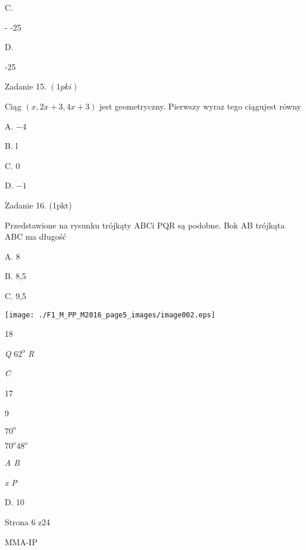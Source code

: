 \documentclass[a4paper,12pt]{article}
\begin{document}
C.

- -25

D.

-25

Zadanie 15. $(1pki)$

Ciąg $(x,2x+3,4x+3)$ jest geometryczny. Pierwszy wyraz tego ciągujest równy

A. $-4$

B. l

C. 0

D. $-1$

Zadanie 16. (1pkt)

Przedstawione na rysunku trójkąty ABCi PQR są podobne. Bok AB trójkąta ABC ma długość

A. 8

B. 8,5

C. 9,5
\begin{center}
\texttt{[image: ./F1\_M\_PP\_M2016\_page5\_images/image002.eps]}
\end{center}
18

{\it Q}  $62^{\mathrm{o}}$  {\it R}

{\it C}

17

9

$70^{\mathrm{o}}$

$70^{\mathrm{o}}  48^{\mathrm{o}}$

{\it A B}

{\it x  P}

D. 10

Strona 6 z24

MMA-IP
\end{document}
